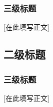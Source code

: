 \documentclass[UTF8,fontset=none,scheme=plain,zihao=-4]{ctexart}
\begin{document}
\subsubsection{三级标题}
[在此填写正文]

\subsection{二级标题}
\ThesisThirdCompactStyle
\subsubsection{三级标题}
[在此填写正文]


\end{document}
